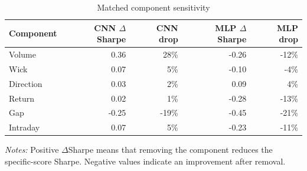 \begin{table}[htbp]
\centering
\caption{Matched component sensitivity}
\label{tab:recent_blocks}
\begin{tabular}{lrrrr}
\toprule
Component & CNN $\Delta$Sharpe & CNN drop & MLP $\Delta$Sharpe & MLP drop \\
\midrule
Volume & 0.36 & 28\% & -0.26 & -12\% \\
Wick & 0.07 & 5\% & -0.10 & -4\% \\
Direction & 0.03 & 2\% & 0.09 & 4\% \\
Return & 0.02 & 1\% & -0.28 & -13\% \\
Gap & -0.25 & -19\% & -0.45 & -21\% \\
Intraday & 0.07 & 5\% & -0.23 & -11\% \\
\bottomrule
\end{tabular}
\begin{minipage}{0.92\linewidth}
\footnotesize
\textit{Notes:} Positive $\Delta$Sharpe means that removing the component reduces the specific-score Sharpe. Negative values indicate an improvement after removal.
\end{minipage}
\end{table}
